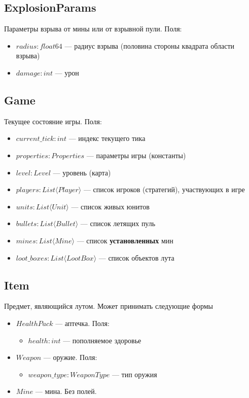 \subsection{ExplosionParams}
Параметры взрыва от мины или от взрывной пули. Поля:
\begin{itemize}
    \item $radius : float64$ --- радиус взрыва (половина стороны квадрата области взрыва)
    \item $damage : int$ --- урон
\end{itemize}

\subsection{Game}
Текущее состояние игры. Поля:
\begin{itemize}
    \item $current\_tick : int$ --- индекс текущего тика
    \item $properties : Properties$ --- параметры игры (константы)
    \item $level : Level$ --- уровень (карта)
    \item $players : List \langle Player \rangle$ --- список игроков (стратегий), участвующих в игре
    \item $units : List \langle Unit \rangle$ --- список живых юнитов
    \item $bullets : List \langle Bullet \rangle$ --- список летящих пуль
    \item $mines : List \langle Mine \rangle$ --- список \textbf{установленных} мин
    \item $loot\_boxes : List \langle LootBox \rangle$ --- список объектов лута
\end{itemize}

\subsection{Item}
Предмет, являющийся лутом.
Может принимать следующие формы
\begin{itemize}
    \item $HealthPack$ --- аптечка. Поля:
        \begin{itemize}
            \item $health : int$ --- пополняемое здоровье
        \end{itemize}
    \item $Weapon$ --- оружие. Поля:
        \begin{itemize}
            \item $weapon\_type : WeaponType$ --- тип оружия
        \end{itemize}
    \item $Mine$ --- мина. Без полей.
\end{itemize}


